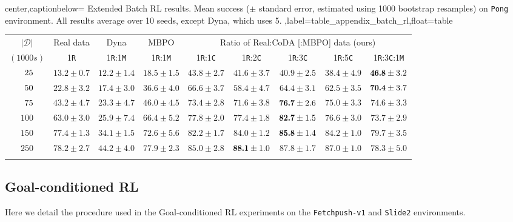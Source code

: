 \documentclass[coda.tex]{subfiles}
\begin{document}
\begin{adjustbox}{center,captionbelow={
Extended Batch RL results. 
Mean success ($\pm$ standard error, estimated using 1000 bootstrap resamples) on \texttt{Pong} environment. All results average over 10 seeds, except Dyna, which uses 5. 
},label=table_appendix_batch_rl,float=table}
\newcommand{\smol}[1]{{\scriptsize\texttt{#1}}}
\centering\small
\begin{tabular}{c@{\hskip 0.2in}ccc@{\hskip 0.16in}|@{\hskip 0.16in}ccccc}
	\toprule
$|\mathcal{D}|$	&Real data& Dyna & MBPO&
\multicolumn{5}{c}{Ratio of Real:CoDA [:MBPO] data (ours)}\\
$(1000s)$ &   1\smol{R}  &   1\smol{R}:1\smol{M} & 1\smol{R}:1\smol{M} &  1\smol{R}:1\smol{C} & 1\smol{R}:2\smol{C}   &  1\smol{R}:3\smol{C}  &  1\smol{R}:5\smol{C} & 1\smol{R}:3\smol{C}:1\smol{M} \\
	\midrule
$\hphantom{0}25$ & $13.2 \pm 0.7$  & $12.2 \pm 1.4$  & $18.5 \pm 1.5$  & $43.8 \pm 2.7$  & $41.6 \pm 3.7$  & $40.9 \pm 2.5$  & $38.4 \pm 4.9$  & $\mybm{46.8} \pm 3.2$  \\
$\hphantom{0}50$ & $22.8 \pm 3.2$  & $17.4 \pm 3.0$  & $36.6 \pm 4.0$  & $66.6 \pm 3.7$  & $58.4 \pm 4.7$  & $64.4 \pm 3.1$  & $62.5 \pm 3.5$  & $\mybm{70.4} \pm 3.7$  \\
$\hphantom{0}75$ & $43.2 \pm 4.7$  & $23.3 \pm 4.7$  & $46.0 \pm 4.5$  & $73.4 \pm 2.8$  & $71.6 \pm 3.8$  & $\mybm{76.7} \pm 2.6$  & $75.0 \pm 3.3$  & $74.6 \pm 3.3$  \\
$100$ & $63.0 \pm 3.0$  & $25.9 \pm 7.4$  & $66.4 \pm 5.2$  & $77.8 \pm 2.0$  & $77.4 \pm 1.8$  & $\mybm{82.7} \pm 1.5$  & $76.6 \pm 3.0$  & $73.7 \pm 2.9$  \\
$150$ & $77.4 \pm 1.3$  & $34.1 \pm 1.5$  & $72.6 \pm 5.6$  & $82.2 \pm 1.7$  & $84.0 \pm 1.2$  & $\mybm{85.8} \pm 1.4$  & $84.2 \pm 1.0$  & $79.7 \pm 3.5$  \\
$250$ & $78.2 \pm 2.7$  & $44.2 \pm 4.0$  & $77.9 \pm 2.3$  & $85.0 \pm 2.8$  & $\mybm{88.1} \pm 1.0$  & $87.8 \pm 1.7$  & $87.0 \pm 1.0$  & $78.3 \pm 5.0$  \\
	\bottomrule\vspace{-0.05in}
\end{tabular}
\end{adjustbox}

\subsection{Goal-conditioned RL}

Here we detail the procedure used in the Goal-conditioned RL experiments on the \texttt{Fetchpush-v1} and \texttt{Slide2} environments.
\end{document}
